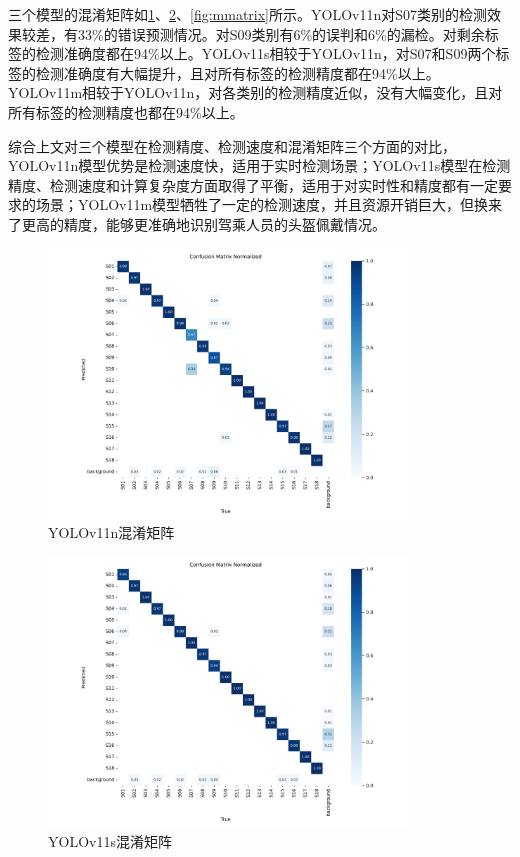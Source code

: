 
三个模型的混淆矩阵如\ref{fig:nmatrix}、\ref{fig:smatrix}、\ref{fig:mmatrix}所示。YOLOv11n对S07类别的检测效果较差，有33\%的错误预测情况。对S09类别有6\%的误判和6\%的漏检。对剩余标签的检测准确度都在94\%以上。YOLOv11s相较于YOLOv11n，对S07和S09两个标签的检测准确度有大幅提升，且对所有标签的检测精度都在94\%以上。YOLOv11m相较于YOLOv11n，对各类别的检测精度近似，没有大幅变化，且对所有标签的检测精度也都在94\%以上。

综合上文对三个模型在检测精度、检测速度和混淆矩阵三个方面的对比，YOLOv11n模型优势是检测速度快，适用于实时检测场景；YOLOv11s模型在检测精度、检测速度和计算复杂度方面取得了平衡，适用于对实时性和精度都有一定要求的场景；YOLOv11m模型牺牲了一定的检测速度，并且资源开销巨大，但换来了更高的精度，能够更准确地识别驾乘人员的头盔佩戴情况。

\begin{figure}[H]
    \centering
    \includegraphics[width=0.85\textwidth]{figs/chap04/n_confusion_matrix_normalized.png}
    \caption{YOLOv11n混淆矩阵}
    \label{fig:nmatrix}
\end{figure}


\begin{figure}[h]
    \centering
    \includegraphics[width=0.85\textwidth]{figs/chap04/s_confusion_matrix_normalized.png}
    \caption{YOLOv11s混淆矩阵}
    \label{fig:smatrix}
\end{figure}


